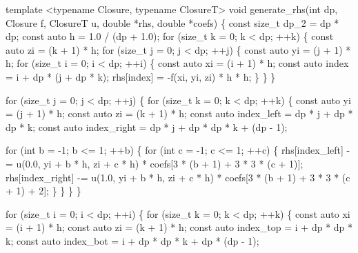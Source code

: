 \begin{DoxyCodeInclude}
\textcolor{keyword}{template} <\textcolor{keyword}{typename} Closure, \textcolor{keyword}{typename} ClosureT>
\textcolor{keywordtype}{void} generate\_rhs(\textcolor{keywordtype}{int} dp, Closure f, ClosureT u, \textcolor{keywordtype}{double} *rhs, \textcolor{keywordtype}{double} *coefs)
\{
    \textcolor{keyword}{const} \textcolor{keywordtype}{size\_t} dp\_2 = dp * dp;
    \textcolor{keyword}{const} \textcolor{keyword}{auto} h = 1.0 / (dp + 1.0);
    \textcolor{keywordflow}{for} (\textcolor{keywordtype}{size\_t} k = 0; k < dp; ++k) \{
        \textcolor{keyword}{const} \textcolor{keyword}{auto} zi = (k + 1) * h;
        \textcolor{keywordflow}{for} (\textcolor{keywordtype}{size\_t} j = 0; j < dp; ++j) \{
            \textcolor{keyword}{const} \textcolor{keyword}{auto} yi = (j + 1) * h;
            \textcolor{keywordflow}{for} (\textcolor{keywordtype}{size\_t} i = 0; i < dp; ++i) \{
                \textcolor{keyword}{const} \textcolor{keyword}{auto} xi = (i + 1) * h;
                \textcolor{keyword}{const} \textcolor{keyword}{auto} index = i + dp * (j + dp * k);
                rhs[index] = -f(xi, yi, zi) * h * h;
            \}
        \}
    \}

    \textcolor{keywordflow}{for} (\textcolor{keywordtype}{size\_t} j = 0; j < dp; ++j) \{
        \textcolor{keywordflow}{for} (\textcolor{keywordtype}{size\_t} k = 0; k < dp; ++k) \{
            \textcolor{keyword}{const} \textcolor{keyword}{auto} yi = (j + 1) * h;
            \textcolor{keyword}{const} \textcolor{keyword}{auto} zi = (k + 1) * h;
            \textcolor{keyword}{const} \textcolor{keyword}{auto} index\_left = dp * j + dp * dp * k;
            \textcolor{keyword}{const} \textcolor{keyword}{auto} index\_right = dp * j + dp * dp * k + (dp - 1);

            \textcolor{keywordflow}{for} (\textcolor{keywordtype}{int} b = -1; b <= 1; ++b) \{
                \textcolor{keywordflow}{for} (\textcolor{keywordtype}{int} c = -1; c <= 1; ++c) \{
                    rhs[index\_left] -= u(0.0, yi + b * h, zi + c * h) *
                                       coefs[3 * (b + 1) + 3 * 3 * (c + 1)];
                    rhs[index\_right] -=
                        u(1.0, yi + b * h, zi + c * h) *
                        coefs[3 * (b + 1) + 3 * 3 * (c + 1) + 2];
                \}
            \}
        \}
    \}

    \textcolor{keywordflow}{for} (\textcolor{keywordtype}{size\_t} i = 0; i < dp; ++i) \{
        \textcolor{keywordflow}{for} (\textcolor{keywordtype}{size\_t} k = 0; k < dp; ++k) \{
            \textcolor{keyword}{const} \textcolor{keyword}{auto} xi = (i + 1) * h;
            \textcolor{keyword}{const} \textcolor{keyword}{auto} zi = (k + 1) * h;
            \textcolor{keyword}{const} \textcolor{keyword}{auto} index\_top = i + dp * dp * k;
            \textcolor{keyword}{const} \textcolor{keyword}{auto} index\_bot = i + dp * dp * k + dp * (dp - 1);


\end{DoxyCodeInclude}
